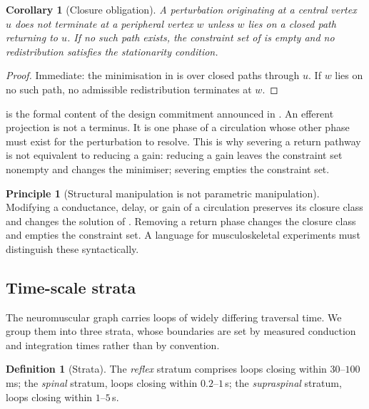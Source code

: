 \documentclass[11pt,twocolumn,a4paper]{article}
\theoremstyle{thmstyle}
\newtheorem{corollary}[theorem]{Corollary}
\theoremstyle{definition}
\newtheorem{definition}[theorem]{Definition}
\newtheorem{principle}[theorem]{Principle}
\theoremstyle{remark}
\begin{document}
\begin{corollary}[Closure obligation]
\label{cor:closure-obligatory}
A perturbation originating at a central vertex $u$ does not terminate at a
peripheral vertex $w$ unless $w$ lies on a closed path returning to $u$. If no
such path exists, the constraint set of  is empty
and no redistribution satisfies the stationarity condition.
\end{corollary}

\begin{proof}
Immediate: the minimisation in  is over closed paths
through $u$. If $w$ lies on no such path, no admissible redistribution
terminates at $w$.
\end{proof}

 is the formal content of the design commitment
announced in . An efferent projection is not a terminus. It is
one phase of a circulation whose other phase must exist for the perturbation
to resolve. This is why severing a return pathway is not equivalent to
reducing a gain: reducing a gain leaves the constraint set nonempty and
changes the minimiser; severing empties the constraint set.

\begin{principle}[Structural manipulation is not parametric manipulation]
\label{prin:structural}
Modifying a conductance, delay, or gain of a circulation preserves its closure
class and changes the solution of . Removing a
return phase changes the closure class and empties the constraint set. A
language for musculoskeletal experiments must distinguish these
syntactically.
\end{principle}

\subsection{Time-scale strata}

The neuromuscular graph carries loops of widely differing traversal time. We
group them into three strata, whose boundaries are set by measured conduction
and integration times rather than by convention.

\begin{definition}[Strata]
\label{def:strata}
The \emph{reflex} stratum comprises loops closing within $30$--$100$\,ms; the
\emph{spinal} stratum, loops closing within $0.2$--$1$\,s; the
\emph{supraspinal} stratum, loops closing within $1$--$5$\,s.
\end{definition}
\end{document}
